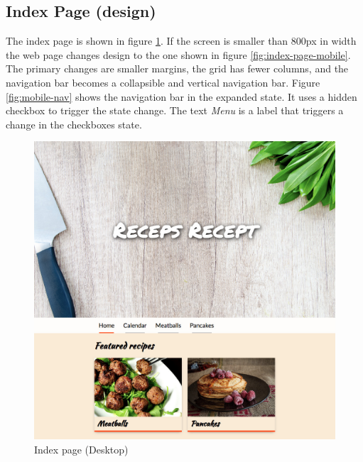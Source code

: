 \documentclass[a4paper]{scrartcl}
\begin{document}
\subsection{Index Page (design)}

The index page is shown in figure \ref{fig:index-page}. If the screen is smaller than 800px in width the web page changes design to the one shown in figure \ref{fig:index-page-mobile}. The primary changes are smaller margins, the grid has fewer columns, and the navigation bar becomes a collapsible and vertical navigation bar. Figure \ref{fig:mobile-nav} shows the navigation bar in the expanded state. It uses a hidden checkbox to trigger the state change. The text \textit{Menu} is a label that triggers a change in the checkboxes state.

\begin{figure}
	\includegraphics[width=\linewidth]{images/screenshot-index.jpg}
	  \caption{Index page (Desktop)}
	\label{fig:index-page}
\end{figure}
\end{document}
